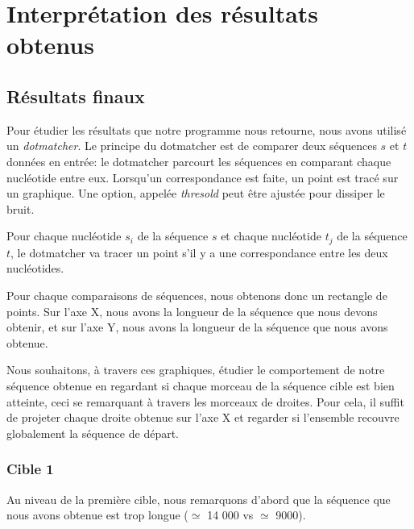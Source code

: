 
\section{Interprétation des résultats obtenus}

\subsection{Résultats finaux}

Pour étudier les résultats que notre programme nous retourne, nous avons utilisé
un \textit{dotmatcher}.
Le principe du dotmatcher est de comparer deux séquences $s$ et $t$ données en
entrée: le dotmatcher parcourt les séquences en comparant chaque nucléotide
entre eux.  Lorsqu'un correspondance est faite, un point est tracé sur un
graphique. Une option, appelée \textit{thresold} peut être ajustée pour dissiper
le bruit.

\FloatBarrier



Pour chaque nucléotide $s_{i}$ de la séquence $s$ et chaque nucléotide $t_{j}$
de la séquence $t$, le dotmatcher va tracer un point s'il y a une correspondance
entre les deux nucléotides.

Pour chaque comparaisons de séquences, nous obtenons donc un rectangle de
points. Sur l'axe X, nous avons la longueur de la séquence que nous devons
obtenir, et sur l'axe Y, nous avons la longueur de la séquence que nous avons
obtenue.

Nous souhaitons, à travers ces graphiques, étudier le comportement de notre
séquence obtenue en regardant si chaque morceau de la séquence cible est bien
atteinte, ceci se remarquant à travers les morceaux de droites. Pour cela, il
suffit de projeter chaque droite obtenue sur l'axe X et regarder si l'ensemble
recouvre globalement la séquence de départ.

\subsubsection*{Cible 1}

Au niveau de la première cible, nous remarquons d'abord que la séquence que nous
avons obtenue est trop longue ($\simeq$ 14 000 vs $\simeq$ 9000).

